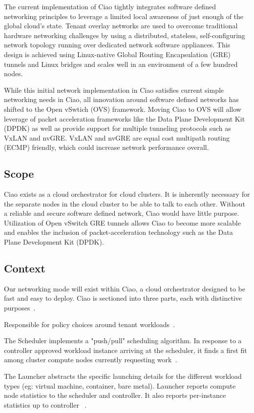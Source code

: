 \documentclass[10pt,onecolumn,journal,draftclsnofoot]{IEEEtran}
\begin{document}
The current implementation of Ciao tightly integrates software defined
networking principles to leverage a limited local awareness of just enough of
the global cloud's state. Tenant overlay networks are used to overcome
traditional hardware networking challenges by using a distributed, stateless,
self-configuring network topology running over dedicated network software
appliances. This design is achieved using Linux-native Global Routing
Encapsulation (GRE) tunnels and Linux bridges and scales well in an environment
of a few hundred nodes.

While this initial network implementation in Ciao satisfies current simple
networking needs in Ciao, all innovation around software defined networks has
shifted to the Open vSwtich (OVS) framework. Moving Ciao to OVS will allow
leverage of packet acceleration frameworks like the Data Plane Development Kit
(DPDK) as well as provide support for multiple tunneling protocols such as VxLAN
and nvGRE. VxLAN and nvGRE are equal cost multipath routing (ECMP) friendly,
which could increase network performance overall.

\subsection{Scope}

Ciao exists as a cloud orchestrator for cloud clusters. It is inherently necessary
for the separate nodes in the cloud cluster to be able to talk to each other.
Without a reliable and secure software defined network, Ciao would have little
purpose. Utilization of Open vSwitch GRE tunnels allows Ciao to become more
scalable and enables the inclusion of packet-acceleration technology such as the
Data Plane Development Kit (DPDK).

\subsection{Context}

Our networking mode will exist within Ciao, a cloud orchestrator designed to be
fast and easy to deploy. Ciao is sectioned into three parts, each with
distinctive purposes~\cite{ciao}.

\begin{description}[leftmargin=12em,style=nextline]
	\item[Controller]
		Responsible for policy choices around tenant
		workloads~\cite{ciao}.
	\item[Scheduler]
		The Scheduler implements a "push/pull" scheduling algorithm. In
		response to a controller approved workload instance arriving at
		the scheduler, it finds a first fit among cluster compute nodes
		currently requesting work~\cite{ciao}.
	\item[Launcher]
		The Launcher abstracts the specific launching details for the
		different workload types (eg: virtual machine, container, bare
		metal). Launcher reports compute node statistics to the
		scheduler and controller. It also reports per-instance
		statistics up to controller ~\cite{ciao}.
\end{description}
\end{document}
